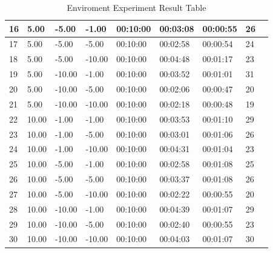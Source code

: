 \begin{table}[]
{\begin{tabular}{|l|l|l|l|l|l|l|l|l|}
16         & 5.00    & -5.00      & -1.00   & 00:10:00 & 00:03:08     & 00:00:55      & 26         \\ \hline
17         & 5.00    & -5.00      & -5.00   & 00:10:00 & 00:02:58     & 00:00:54      & 24         \\ \hline
18         & 5.00    & -5.00      & -10.00  & 00:10:00 & 00:04:48     & 00:01:17      & 23         \\ \hline
19         & 5.00    & -10.00     & -1.00   & 00:10:00 & 00:03:52     & 00:01:01      & 31         \\ \hline
20         & 5.00    & -10.00     & -5.00   & 00:10:00 & 00:02:06     & 00:00:47      & 20         \\ \hline
21         & 5.00    & -10.00     & -10.00  & 00:10:00 & 00:02:18     & 00:00:48      & 19         \\ \hline
22         & 10.00   & -1.00      & -1.00   & 00:10:00 & 00:03:53     & 00:01:10      & 29         \\ \hline
23         & 10.00   & -1.00      & -5.00   & 00:10:00 & 00:03:01     & 00:01:06      & 26         \\ \hline
24         & 10.00   & -1.00      & -10.00  & 00:10:00 & 00:04:31     & 00:01:04      & 23         \\ \hline
25         & 10.00   & -5.00      & -1.00   & 00:10:00 & 00:02:58     & 00:01:08      & 25         \\ \hline
26         & 10.00   & -5.00      & -5.00   & 00:10:00 & 00:03:37     & 00:01:08      & 26         \\ \hline
27         & 10.00   & -5.00      & -10.00  & 00:10:00 & 00:02:22     & 00:00:55      & 20         \\ \hline
28         & 10.00   & -10.00     & -1.00   & 00:10:00 & 00:04:39     & 00:01:07      & 29         \\ \hline
29         & 10.00   & -10.00     & -5.00   & 00:10:00 & 00:02:40     & 00:00:55      & 23         \\ \hline
30         & 10.00   & -10.00     & -10.00  & 00:10:00 & 00:04:03     & 00:01:07      & 30         \\ \hline
\end{tabular}}
\caption{Enviroment Experiment Result Table}
\label{tab:enviroment_experiment_result}
\end{table}



